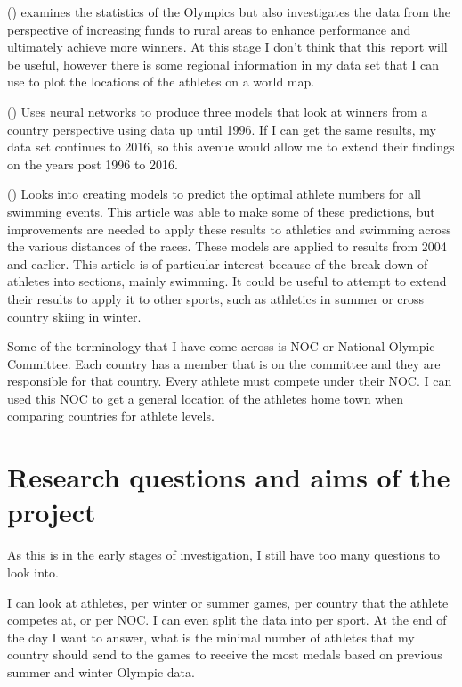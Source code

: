 \documentclass[
]{article}
\begin{document}
() examines the statistics of the Olympics but also investigates the data from the perspective of increasing funds to rural areas to enhance performance and ultimately achieve more winners. At this stage I don't think that this report will be useful, however there is some regional information in my data set that I can use to plot the locations of the athletes on a world map.

() Uses neural networks to produce three models that look at winners from a country perspective using data up until 1996. If I can get the same results, my data set continues to 2016, so this avenue would allow me to extend their findings on the years post 1996 to 2016.

() Looks into creating models to predict the optimal athlete numbers for all swimming events. This article was able to make some of these predictions, but improvements are needed to apply these results to athletics and swimming across the various distances of the races. These models are applied to results from 2004 and earlier. This article is of particular interest because of the break down of athletes into sections, mainly swimming. It could be useful to attempt to extend their results to apply it to other sports, such as athletics in summer or cross country skiing in winter.

Some of the terminology that I have come across is NOC or National Olympic Committee. Each country has a member that is on the committee and they are responsible for that country. Every athlete must compete under their NOC. I can used this NOC to get a general location of the athletes home town when comparing countries for athlete levels.

\section{Research questions and aims of the project}\label{research-questions-and-aims-of-the-project}

As this is in the early stages of investigation, I still have too many questions to look into.

I can look at athletes, per winter or summer games, per country that the athlete competes at, or per NOC. I can even split the data into per sport. At the end of the day I want to answer, what is the minimal number of athletes that my country should send to the games to receive the most medals based on previous summer and winter Olympic data.
\end{document}
